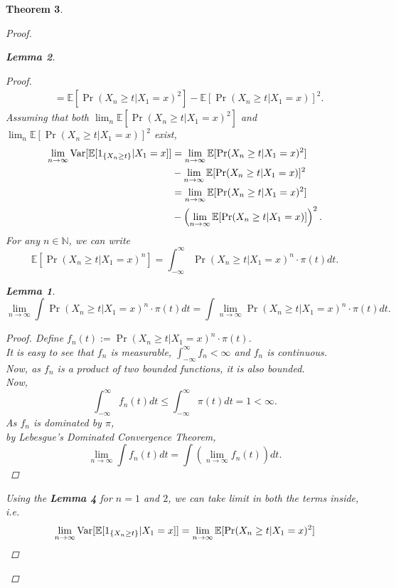 \documentclass{article}
\newtheorem{theorem}{Theorem}[section]
\newtheorem{lemma}[theorem]{Lemma}
\begin{document}
\begin{theorem}
\begin{proof}
\begin{lemma}
\begin{proof}
\begin{align*}
						&= \mathbb{E}[\Pr(X_{n} \geq t | X_{1} = x)^2] - \mathbb{E}[\Pr(X_{n} \geq t | X_{1} = x)]^2.
					\end{align*}
					Assuming that both $\lim_n \mathbb{E}[\Pr(X_{n} \geq t | X_{1} = x)^2]$ and  $\lim_n \mathbb{E}[\Pr(X_{n} \geq t | X_{1} = x)]^2$ exist,
					\begin{align*}
						\lim_{n \rightarrow \infty} \text{Var}[\mathbb{E}[1_{\{X_{n} \geq t\}}|X_1=x]] &= \lim_{n \rightarrow \infty} \mathbb{E}[\Pr(X_{n} \geq t | X_{1} = x)^2]\\
						&- \lim_{n \rightarrow \infty} \mathbb{E}[\Pr(X_{n} \geq t | X_{1} = x)]^2\\
						&= \lim_{n \rightarrow \infty} \mathbb{E}[\Pr(X_{n} \geq t | X_{1} = x)^2]\\
						&- \left(\lim_{n \rightarrow \infty} \mathbb{E}[\Pr(X_{n} \geq t | X_{1} = x)]\right)^2.\\
					\end{align*}
					For any $n \in \mathbb{N}$, we can write
					$$\mathbb{E}[\Pr(X_{n} \geq t | X_{1} = x)^n] = \int_{-\infty}^{\infty} \Pr(X_{n} \geq t | X_{1} = x)^n \cdot \pi(t)dt.$$
					\begin{lemma}
						$$\lim_{n \rightarrow \infty} \int \Pr(X_{n} \geq t | X_{1} = x)^n \cdot \pi(t) dt = \int \lim_{n \rightarrow \infty}\Pr(X_{n} \geq t | X_{1} = x)^n \cdot \pi(t)dt.$$
						\begin{proof}
							Define $f_n(t) := \Pr(X_{n} \geq t | X_{1} = x)^n \cdot \pi(t)$. \\
							It is easy to see that $f_n$ is measurable, $\int_{-\infty}^{\infty} f_n < \infty$ and $f_n$ is continuous.\\
							Now, as $f_n$ is a product of two bounded functions, it is also bounded. \\
							Now,
							$$\int_{-\infty}^{\infty} f_n(t)dt \leq \int_{-\infty}^{\infty} \pi(t)dt = 1 < \infty.$$
							As $f_n$ is dominated by $\pi$, \\
							by Lebesgue's Dominated Convergence Theorem,
							$$\lim_{n \rightarrow \infty} \int f_n(t) dt = \int \left(\lim_{n \rightarrow \infty} f_n(t)\right) dt.$$
						\end{proof}
					\end{lemma}
					Using the \textbf{Lemma 4} for $n = 1$ and $2$, we can take limit in both the terms inside, i.e.
					\begin{align*}
						\lim_{n \rightarrow \infty} \Var[\mathbb{E}[1_{\{X_{n} \geq t\}}|X_1=x]] &= \lim_{n \rightarrow \infty} \mathbb{E}[\Pr(X_{n} \geq t | X_{1} = x)^2]\\

\end{align*}
\end{proof}
\end{lemma}
\end{proof}
\end{theorem}
\end{document}
